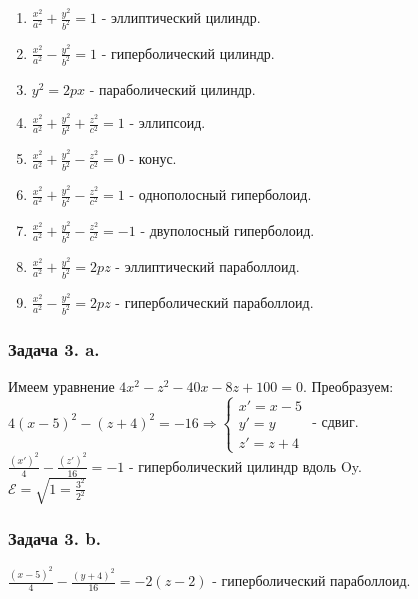 \documentclass[12pt, letterpaper, twoside]{article}
\begin{document}
\begin{enumerate}
    \item $\frac{x^2}{a^2} + \frac{y^2}{b^2} = 1$ - эллиптический цилиндр.
    \item $\frac{x^2}{a^2} - \frac{y^2}{b^2} = 1$ - гиперболический цилиндр.
    \item $y^2 = 2px$ - параболический цилиндр.
    \item $\frac{x^2}{a^2} + \frac{y^2}{b^2} + \frac{z^2}{c^2} = 1$ - эллипсоид.
    \item $\frac{x^2}{a^2} + \frac{y^2}{b^2} - \frac{z^2}{c^2} = 0$ - конус.
    \item $\frac{x^2}{a^2} + \frac{y^2}{b^2} - \frac{z^2}{c^2} = 1$ - однополосный гиперболоид.
    \item $\frac{x^2}{a^2} + \frac{y^2}{b^2} - \frac{z^2}{c^2} = -1$ - двуполосный гиперболоид.
    \item $\frac{x^2}{a^2} + \frac{y^2}{b^2} = 2pz$ - эллиптический параболлоид.
    \item $\frac{x^2}{a^2} - \frac{y^2}{b^2} = 2pz$ - гиперболический параболлоид.
\end{enumerate}
\subsubsection*{Задача 3. a.}
Имеем уравнение $4x^2 - z^2 - 40x - 8z + 100 = 0$. Преобразуем:\\
$4(x - 5)^2 - (z + 4)^2 = -16\Rightarrow \begin{cases}
    x' = x - 5\\
    y' = y\\
    z' = z + 4
\end{cases}$ - сдвиг.\\
$\frac{(x')^2}{4} - \frac{(z')^2}{16} = -1$ - гиперболический цилиндр вдоль Oy.\\
$\mathcal{E} = \sqrt{1 = \frac{3^2}{2^2}}$
\subsubsection*{Задача 3. b.}
$\frac{(x - 5)^2}{4} - \frac{(y + 4)^2}{16} = -2(z - 2) $ - гиперболический параболлоид.
\end{document}
